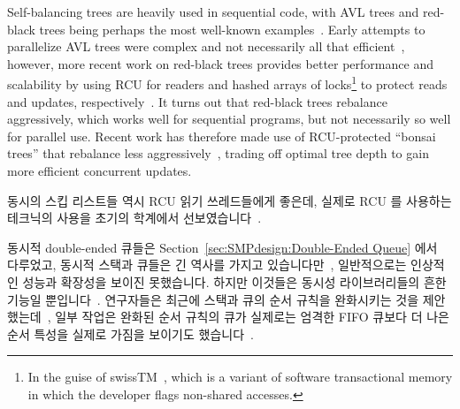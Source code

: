 Self-balancing trees are heavily used in sequential code, with
AVL trees and red-black trees being perhaps the most well-known
examples~\cite{ThomasHCorman2001Algorithms}.
Early attempts to parallelize AVL trees were complex and not necessarily
all that efficient~\cite{Ellis80},
however, more recent work on red-black trees provides better
performance and scalability by using RCU for readers and hashed arrays
of locks\footnote{
	In the guise of swissTM~\cite{AleksandarDragovejic2011STMnotToy},
	which is a variant of software transactional memory in which
	the developer flags non-shared accesses.}
to protect reads and updates,
respectively~\cite{PhilHoward2011RCUTMRBTree,PhilipWHoward2013RCUrbtree}.
It turns out that red-black trees rebalance aggressively, which works
well for sequential programs, but not necessarily so well for parallel
use.
Recent work has therefore made use of RCU-protected ``bonsai trees''
that rebalance less aggressively~\cite{AustinClements2012RCULinux:mmapsem},
trading off optimal tree depth to gain more efficient concurrent updates.
\fi

동시의 스킵 리스트들 역시 RCU 읽기 쓰레드들에게 좋은데, 실제로 RCU 를 사용하는
테크닉의 사용을 초기의 학계에서 선보였습니다~\cite{Pugh90}.

동시적 double-ended 큐들은
Section~\ref{sec:SMPdesign:Double-Ended Queue} 에서 다루었고,
동시적 스택과 큐들은 긴 역사를 가지고 있습니다만~\cite{Treiber86},
일반적으로는 인상적인 성능과 확장성을 보이진 못했습니다.
하지만 이것들은 동시성 라이브러리들의 흔한 기능일
뿐입니다~\cite{PaulMcKenney2013LWNURCUqueuestack}.
연구자들은 최근에 스택과 큐의 순서 규칙을 완화시키는 것을
제안했는데~\cite{Shavit:2011:DSM:1897852.1897873}, 일부 작업은 완화된 순서
규칙의 큐가 실제로는 엄격한 FIFO 큐보다 더 나은 순서 특성을 실제로 가짐을
보이기도
했습니다~\cite{AndreasHaas2012FIFOisnt,ChristophMKirsch2012FIFOisntTR,AndreasHaas2013CFRelaxedQueues}.

